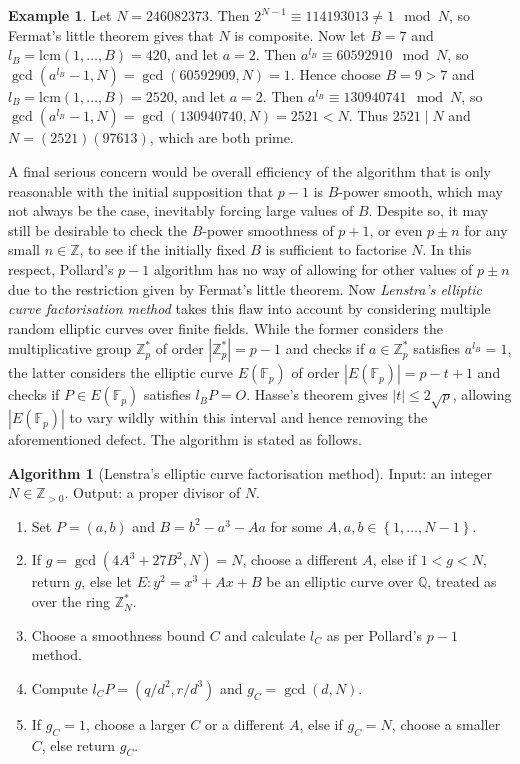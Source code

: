 \documentclass{article}
\newcommand{\F}{\mathbb{F}}
\newcommand{\Z}{\mathbb{Z}}
\newcommand{\Q}{\mathbb{Q}}
\newcommand{\rb}[1]{\left( #1 \right)}
\newcommand{\cb}[1]{\left\{ #1 \right\}}
\newcommand{\abs}[1]{\left\lvert #1 \right\rvert}
\theoremstyle{definition}\newtheorem*{definition}{Definition}
\theoremstyle{definition}\newtheorem*{example}{Example}
\theoremstyle{definition}\newtheorem*{remark}{Remark}
\newtheorem{algorithm}[proposition]{Algorithm}
\begin{document}
\begin{example}
Let $ N = 246082373 $. Then $ 2^{N - 1} \equiv 114193013 \ne 1 \mod N $, so Fermat's little theorem gives that $ N $ is composite. Now let $ B = 7 $ and $ l_B = \text{lcm}\rb{1, \dots, B} = 420 $, and let $ a = 2 $. Then $ a^{l_B} \equiv 60592910 \mod N $, so $ \gcd\rb{a^{l_B} - 1, N} = \gcd\rb{60592909, N} = 1 $. Hence choose $ B = 9 > 7 $ and $ l_B = \text{lcm}\rb{1, \dots, B} = 2520 $, and let $ a = 2 $. Then $ a^{l_B} \equiv 130940741 \mod N $, so $ \gcd\rb{a^{l_B} - 1, N} = \gcd\rb{130940740, N} = 2521 < N $. Thus $ 2521 \mid N $ and $ N = \rb{2521}\rb{97613} $, which are both prime.
\end{example}

A final serious concern would be overall efficiency of the algorithm that is only reasonable with the initial supposition that $ p - 1 $ is $ B $-power smooth, which may not always be the case, inevitably forcing large values of $ B $. Despite so, it may still be desirable to check the $ B $-power smoothness of $ p + 1 $, or even $ p \pm n $ for any small $ n \in \Z $, to see if the initially fixed $ B $ is sufficient to factorise $ N $. In this respect, Pollard's $ p - 1 $ algorithm has no way of allowing for other values of $ p \pm n $ due to the restriction given by Fermat's little theorem. Now \emph{Lenstra's elliptic curve factorisation method} takes this flaw into account by considering multiple random elliptic curves over finite fields. While the former considers the multiplicative group $ \Z_p^* $ of order $ \abs{\Z_p^*} = p - 1 $ and checks if $ a \in \Z_p^* $ satisfies $ a^{l_B} = 1 $, the latter considers the elliptic curve $ E\rb{\F_p} $ of order $ \abs{E\rb{\F_p}} = p - t + 1 $ and checks if $ P \in E\rb{\F_p} $ satisfies $ l_BP = O $. Hasse's theorem gives $ \abs{t} \le 2\sqrt{p} $, allowing $ \abs{E\rb{\F_p}} $ to vary wildly within this interval and hence removing the aforementioned defect. The algorithm is stated as follows.

\begin{algorithm}[Lenstra's elliptic curve factorisation method]
Input: an integer $ N \in \Z_{> 0} $. Output: a proper divisor of $ N $.
\begin{enumerate}
\item Set $ P = \rb{a, b} $ and $ B = b^2 - a^3 - Aa $ for some $ A, a, b \in \cb{1, \dots, N - 1} $.
\item If $ g = \gcd\rb{4A^3 + 27B^2, N} = N $, choose a different $ A $, else if $ 1 < g < N $, return $ g $, else let $ E : y^2 = x^3 + Ax + B $ be an elliptic curve over $ \Q $, treated as over the ring $ \Z_N^* $.
\item Choose a smoothness bound $ C $ and calculate $ l_C $ as per Pollard's $ p - 1 $ method.
\item Compute $ l_CP = \rb{q / d^2, r / d^3} $ and $ g_C = \gcd\rb{d, N} $.
\item If $ g_C = 1 $, choose a larger $ C $ or a different $ A $, else if $ g_C = N $, choose a smaller $ C $, else return $ g_C $.
\end{enumerate}
\end{algorithm}
\end{document}
